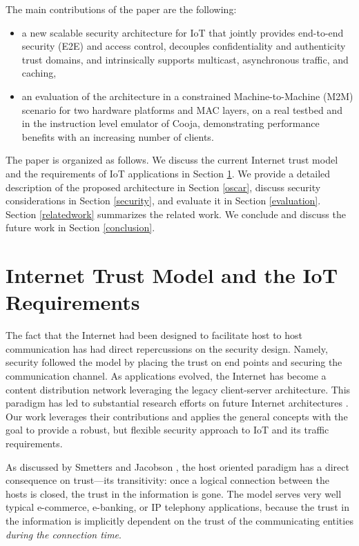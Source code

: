 \documentclass[conference]{IEEEtran}
\begin{document}
The main contributions of the paper are the following:
\begin{itemize}
\item a new scalable security architecture for IoT that jointly provides end-to-end security (E2E) and access control, decouples confidentiality and authenticity trust domains, and intrinsically supports multicast, asynchronous traffic, and caching, 
\item an evaluation of the architecture in a constrained Machine-to-Machine (M2M) scenario for two
  hardware platforms and MAC layers, on a real testbed and in the instruction level emulator of Cooja, demonstrating performance benefits with an increasing number of clients.
\end{itemize}

The paper is organized as follows. We discuss the current Internet trust model and the requirements of  IoT applications in Section \ref{internet-trust-model}. We provide a detailed description of the proposed architecture in Section \ref{oscar}, discuss security considerations in Section \ref{security},
and evaluate it in Section \ref{evaluation}. Section \ref{relatedwork} summarizes the
related work. We conclude and discuss the future work in Section \ref{conclusion}.
 
 \section{Internet Trust Model and the IoT Requirements}
\label{internet-trust-model}
The fact that the Internet had been designed to facilitate host to host communication has had direct repercussions on the security design. Namely, security followed the model by placing the trust on end points and securing the communication channel. As applications evolved, the Internet has become a content distribution network leveraging the legacy client-server architecture.  This paradigm has led to substantial research efforts on future Internet architectures \cite{ccn, dona}. 
Our work leverages their contributions and applies the general concepts with the goal to provide a robust, but flexible security approach to IoT and its traffic requirements. 

 
As discussed by Smetters and Jacobson \cite{securing-content}, the host oriented
paradigm has a direct consequence on trust---its transitivity: once a
logical connection between the hosts is closed, the trust in the information is
gone. The model serves very well typical e-commerce, e-banking, or IP telephony
applications, because the trust in the information is implicitly dependent on
the trust of the communicating entities \textit{during the connection time}. 
 
\end{document}
